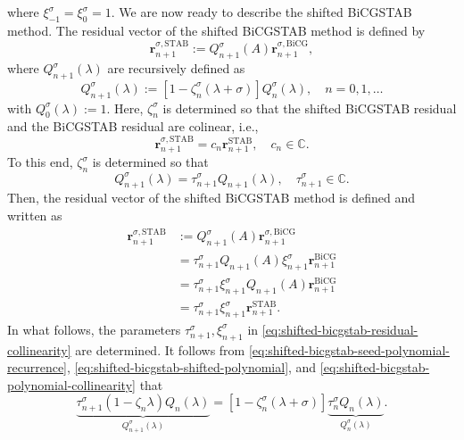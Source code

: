 {where $\xi_{-1}^{\sigma}=\xi_0^{\sigma}=1$.}
{We are now ready to describe the shifted BiCGSTAB method. The residual vector of the shifted BiCGSTAB method is defined by}
\[\bm r_{n+1}^{\sigma,\mathrm{STAB}}:=Q_{n+1}^{\sigma}(A)\bm r_{n+1}^{\sigma,\mathrm{BiCG}},\]
{where $Q_{n+1}^{\sigma}(\lambda)$ are recursively defined as}
\begin{equation}\label{eq:shifted-bicgstab-shifted-polynomial}Q_{n+1}^{\sigma}(\lambda):=[1-\zeta_n^{\sigma}(\lambda+\sigma)]Q_n^{\sigma}(\lambda),\quad n=0,1,\ldots\end{equation}
{with $Q_0^{\sigma}(\lambda):=1$. Here, $\zeta_n^{\sigma}$ is determined so that the shifted BiCGSTAB residual and the BiCGSTAB residual are colinear, i.e.,}
\[\bm r_{n+1}^{\sigma,\mathrm{STAB}}=c_n\bm r_{n+1}^{\mathrm{STAB}},\quad c_n\in\mathbb C.\]
{To this end, $\zeta_n^{\sigma}$ is determined so that}
\begin{equation}\label{eq:shifted-bicgstab-polynomial-collinearity}Q_{n+1}^{\sigma}(\lambda)=\tau_{n+1}^{\sigma}Q_{n+1}(\lambda),\quad\tau_{n+1}^{\sigma}\in\mathbb C.\end{equation}
{Then, the residual vector of the shifted BiCGSTAB method is defined and written as}
\begin{equation}\label{eq:shifted-bicgstab-residual-collinearity}\begin{aligned}\bm r_{n+1}^{\sigma,\mathrm{STAB}}&:=Q_{n+1}^{\sigma}(A)\bm r_{n+1}^{\sigma,\mathrm{BiCG}}\\&=\tau_{n+1}^{\sigma}Q_{n+1}(A)\xi_{n+1}^{\sigma}\bm r_{n+1}^{\mathrm{BiCG}}\\&=\tau_{n+1}^{\sigma}\xi_{n+1}^{\sigma}Q_{n+1}(A)\bm r_{n+1}^{\mathrm{BiCG}}\\&=\tau_{n+1}^{\sigma}\xi_{n+1}^{\sigma}\bm r_{n+1}^{\mathrm{STAB}}.\end{aligned}\end{equation}
{In what follows, the parameters $\tau_{n+1}^{\sigma},\xi_{n+1}^{\sigma}$ in \eqref{eq:shifted-bicgstab-residual-collinearity} are determined. It follows from \eqref{eq:shifted-bicgstab-seed-polynomial-recurrence}, \eqref{eq:shifted-bicgstab-shifted-polynomial}, and \eqref{eq:shifted-bicgstab-polynomial-collinearity} that}
\begin{equation}\label{eq:shifted-bicgstab-polynomial-matching}\underbrace{\tau_{n+1}^{\sigma}(1-\zeta_n\lambda)Q_n(\lambda)}_{Q_{n+1}^{\sigma}(\lambda)}=[1-\zeta_n^{\sigma}(\lambda+\sigma)]\underbrace{\tau_n^{\sigma}Q_n(\lambda)}_{Q_n^{\sigma}(\lambda)}.\end{equation}
